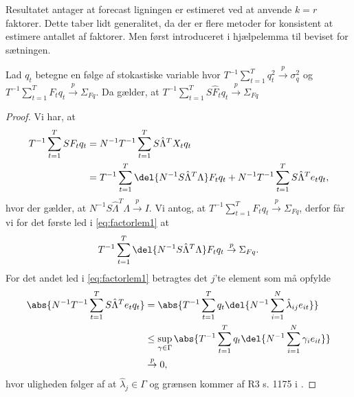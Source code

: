 Resultatet antager at forecast ligningen er estimeret ved at anvende \(k=r\) faktorer.
Dette taber lidt generalitet, da der er flere metoder for konsistent at estimere antallet af faktorer.
Men først introduceret i hjælpelemma til beviset for sætningen.
%
\begin{lem} \label{lem:factorlem1}
Lad \(q_t\) betegne en følge af stokastiske variable hvor \(T^{-1} \sum_{t=1}^T q_t^2 \overset{p}{\rightarrow} \sigma_q^2\) og \(T^{-1} \sum_{t=1}^T F_t q_t \overset{p}{\rightarrow} \Sigma_{Fq}\).
Da gælder, at \(T^{-1} \sum_{t=1}^T S \hat{F}_t q_t \overset{p}{\rightarrow} \Sigma_{Fq}\)
\end{lem}
%
\begin{proof}
Vi har, at
\begin{align}
T^{-1} \sum_{t=1}^T S F_t q_t &= N^{-1} T^{-1} \sum_{t=1}^T S \hat{\Lambda}^T X_t q_t \nonumber \\
&= T^{-1} \sum_{t=1}^T \del{N^{-1} S \hat{\Lambda}^T \Lambda} F_t q_t + N^{-1} T^{-1} \sum_{t=1}^T S \hat{\Lambda}^T e_t q_t, \label{eq:factorlem1}
\end{align}
hvor der gælder, at \(N^{-1} S \hat{\Lambda}^T \Lambda \overset{p}{\rightarrow} I\).
Vi antog, at \(T^{-1} \sum_{t=1}^T F_t q_t \overset{p}{\rightarrow} \Sigma_{Fq}\), derfor får vi for det første led i \eqref{eq:factorlem1} at
\begin{align*}
T^{-1} \sum_{t=1}^T \del{N^{-1} S \hat{\Lambda}^T \Lambda} F_t q_t \overset{p}{\rightarrow} \Sigma_{Fq}.
\end{align*}
For det andet led i \eqref{eq:factorlem1} betragtes det \(j\)'te element som må opfylde
\begin{align*}
\abs{N^{-1} T^{-1} \sum_{t=1}^T S \hat{\Lambda}^T e_t q_t} &= \abs{T^{-1} \sum_{t=1}^T q_t \del{N^{-1} \sum_{i=1}^N \hat{\lambda}_{ij} e_{it}}} \\
& \leq \sup_{\gamma \in \Gamma} \abs{T^{-1} \sum_{t=1}^T q_t \del{N^{-1} \sum_{i=1}^N \gamma_i e_{it}}} \\
& \overset{p}{\rightarrow} 0,
\end{align*}
hvor uligheden følger af at \(\hat{\lambda}_j \in \Gamma\) og grænsen kommer af R3 s. 1175 i \citep{stock_watson_2002a}.
\end{proof}

